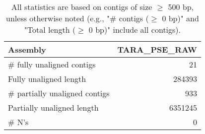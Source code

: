 \documentclass[12pt,a4paper]{article}
\begin{document}
\begin{table}[ht]
\begin{center}
\caption{All statistics are based on contigs of size $\geq$ 500 bp, unless otherwise noted (e.g., "\# contigs ($\geq$ 0 bp)" and "Total length ($\geq$ 0 bp)" include all contigs).}
\begin{tabular}{|l*{1}{|r}|}
\hline
Assembly & TARA\_PSE\_RAW \\ \hline
\# fully unaligned contigs & 21 \\ \hline
Fully unaligned length & 284393 \\ \hline
\# partially unaligned contigs & 933 \\ \hline
Partially unaligned length & 6351245 \\ \hline
\# N's & 0 \\ \hline
\end{tabular}
\end{center}
\end{table}
\end{document}

